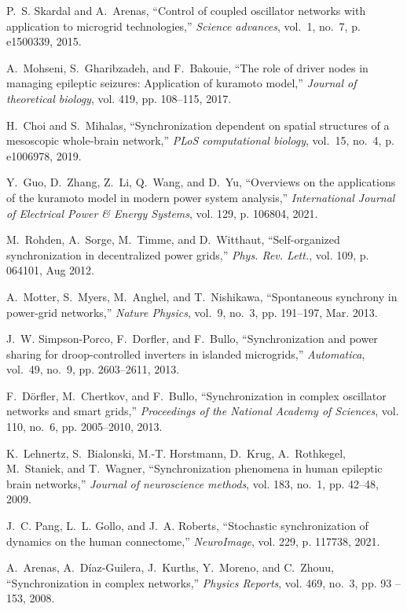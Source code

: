\documentclass{article}
\begin{document}
\begin{thebibliography}{10}
P.~S. Skardal and A.~Arenas, ``Control of coupled oscillator networks with
  application to microgrid technologies,'' \emph{Science advances}, vol.~1,
  no.~7, p. e1500339, 2015.

A.~Mohseni, S.~Gharibzadeh, and F.~Bakouie, ``The role of driver nodes in
  managing epileptic seizures: Application of kuramoto model,'' \emph{Journal
  of theoretical biology}, vol. 419, pp. 108--115, 2017.

H.~Choi and S.~Mihalas, ``Synchronization dependent on spatial structures of a
  mesoscopic whole-brain network,'' \emph{PLoS computational biology}, vol.~15,
  no.~4, p. e1006978, 2019.

Y.~Guo, D.~Zhang, Z.~Li, Q.~Wang, and D.~Yu, ``Overviews on the applications of
  the kuramoto model in modern power system analysis,'' \emph{International
  Journal of Electrical Power \& Energy Systems}, vol. 129, p. 106804, 2021.

M.~Rohden, A.~Sorge, M.~Timme, and D.~Witthaut, ``Self-organized
  synchronization in decentralized power grids,'' \emph{Phys. Rev. Lett.}, vol.
  109, p. 064101, Aug 2012.

A.~Motter, S.~Myers, M.~Anghel, and T.~Nishikawa, 
``Spontaneous synchrony in power-grid networks,''
  \emph{{Nature Physics}}, vol.~9, no.~3, pp.
  191--197, Mar. 2013.

J.~W. Simpson-Porco, F.~Dorfler, and F.~Bullo, ``Synchronization and power
  sharing for droop-controlled inverters in islanded microgrids,''
  \emph{Automatica}, vol.~49, no.~9, pp. 2603--2611, 2013.

F.~D{\"o}rfler, M.~Chertkov, and F.~Bullo, ``Synchronization in complex
  oscillator networks and smart grids,'' \emph{Proceedings of the National
  Academy of Sciences}, vol. 110, no.~6, pp. 2005--2010, 2013.

K.~Lehnertz, S.~Bialonski, M.-T. Horstmann, D.~Krug, A.~Rothkegel, M.~Staniek,
  and T.~Wagner, ``Synchronization phenomena in human epileptic brain
  networks,'' \emph{Journal of neuroscience methods}, vol. 183, no.~1, pp.
  42--48, 2009.

J.~C. Pang, L.~L. Gollo, and J.~A. Roberts, ``Stochastic synchronization of
  dynamics on the human connectome,'' \emph{NeuroImage}, vol. 229, p. 117738,
  2021.

A.~Arenas, A.~Díaz-Guilera, J.~Kurths, Y.~Moreno, and C.~Zhouu,
  ``Synchronization in complex networks,'' \emph{Physics Reports}, vol. 469,
  no.~3, pp. 93 -- 153, 2008.


\end{thebibliography}
\end{document}
